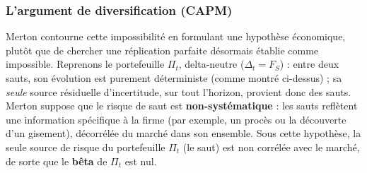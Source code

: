 \documentclass{article}
\begin{document}
\subsubsection*{L'argument de diversification (CAPM)}
Merton contourne cette impossibilité en formulant une hypothèse économique, plutôt que de chercher une réplication parfaite désormais établie comme impossible. Reprenons le portefeuille $\Pi_t$, delta-neutre ($\Delta_t=F_S$) : entre deux sauts, son évolution est purement déterministe (comme montré ci-dessus) ; sa \emph{seule} source résiduelle d'incertitude, sur tout l'horizon, provient donc des sauts.
Merton suppose que le risque de saut est \textbf{non-systématique} : les sauts reflètent une information spécifique à la firme (par exemple, un procès ou la découverte d'un gisement), décorrélée du marché dans son ensemble. Sous cette hypothèse, la seule source de risque du portefeuille $\Pi_t$ (le saut) est non corrélée avec le marché, de sorte que le \textbf{bêta} de $\Pi_t$ est nul.
\end{document}
